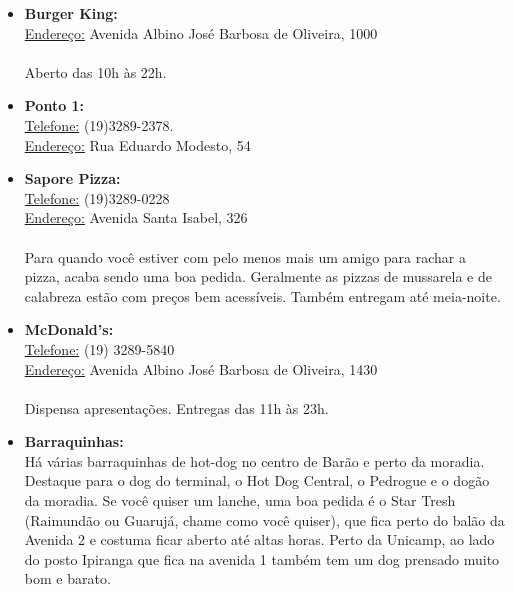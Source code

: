 \begin{itemize}
\item  \textbf{Burger King:}
\\\underline{Endereço:} Avenida Albino José Barbosa de Oliveira, 1000
\\\\Aberto das 10h às 22h.
\end{itemize}

\begin{itemize}
\item  \textbf{Ponto 1:}
\\\underline{Telefone:} (19)3289-2378.
\\\underline{Endereço:} Rua Eduardo Modesto, 54
\end{itemize}

\begin{itemize}
\item  \textbf{Sapore Pizza:}
\\\underline{Telefone:} (19)3289-0228
\\\underline{Endereço:} Avenida Santa Isabel, 326
\\\\Para quando você estiver com pelo menos mais um amigo para rachar a pizza, acaba sendo uma boa pedida. Geralmente as pizzas de mussarela e de calabreza estão com preços bem acessíveis. Também entregam até meia-noite.
\end{itemize}

\begin{itemize}
\item  \textbf{McDonald's:}
\\\underline{Telefone:} (19) 3289-5840
\\\underline{Endereço:} Avenida Albino José Barbosa de Oliveira, 1430
\\\\Dispensa apresentações. Entregas das 11h às 23h.
\end{itemize}

\begin{itemize}
\item  \textbf{Barraquinhas:}
\\Há várias barraquinhas de hot-dog no centro de Barão e perto da moradia. Destaque para o dog do terminal, o Hot Dog Central, o Pedrogue e o dogão da moradia. Se você quiser um lanche, uma boa pedida é o Star Tresh (Raimundão ou Guarujá, chame como você quiser), que fica perto do balão da Avenida 2 e costuma ficar aberto até altas horas. Perto da Unicamp, ao lado do posto Ipiranga que fica na avenida 1 também tem um dog prensado muito bom e barato.
\end{itemize}

